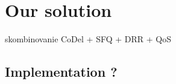 \chapter{Our solution}
\label{chap:ec}
skombinovanie CoDel + SFQ + DRR + QoS

\section{Implementation ?}

